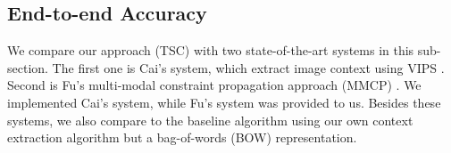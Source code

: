 
\subsection{End-to-end Accuracy}
\label{sec:end2end}
We compare our approach (TSC) with two state-of-the-art systems
in this sub-section.
The first one is Cai's \cite{Cai2004} system,
which extract image context using VIPS \cite{VIPS}.
Second is Fu's multi-modal constraint propagation approach (MMCP) \cite{Fu2011}.
We implemented Cai's system, while Fu's system was provided to us.
Besides these systems, we also compare to the baseline algorithm using
our own context extraction algorithm but a bag-of-words (BOW) representation.




